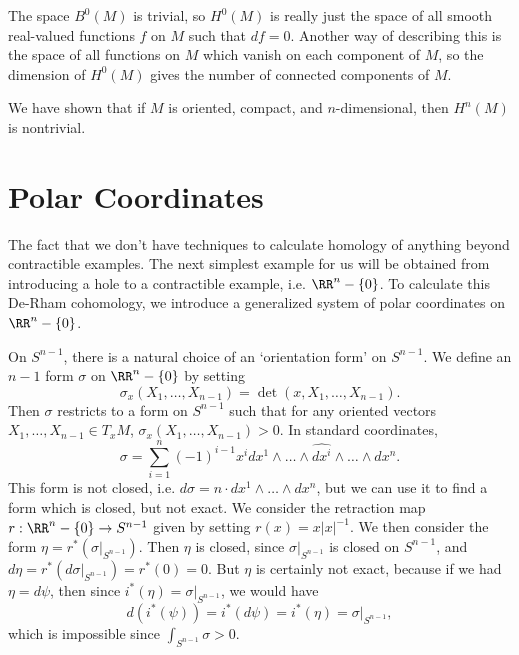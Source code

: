 \begin{example}
    The space $B^0(M)$ is trivial, so $H^0(M)$ is really just the space of all smooth real-valued functions $f$ on $M$ such that $df = 0$. Another way of describing this is the space of all functions on $M$ which vanish on each component of $M$, so the dimension of $H^0(M)$ gives the number of connected components of $M$.
\end{example}

\begin{example}
    We have shown that if $M$ is oriented, compact, and $n$-dimensional, then $H^n(M)$ is nontrivial.
\end{example}

\section{Polar Coordinates}

The fact that we don't have techniques to calculate homology of anything beyond contractible examples. The next simplest example for us will be obtained from introducing a hole to a contractible example, i.e. $\RR^n - \{ 0 \}$. To calculate this De-Rham cohomology, we introduce a generalized system of polar coordinates on $\RR^n - \{ 0 \}$.

On $S^{n-1}$, there is a natural choice of an `orientation form' on $S^{n-1}$. We define an $n-1$ form $\sigma$ on $\RR^n - \{ 0 \}$ by setting
%
\[ \sigma_x(X_1, \dots, X_{n-1}) = \det(x,X_1, \dots, X_{n-1}). \]
%
Then $\sigma$ restricts to a form on $S^{n-1}$ such that for any oriented vectors $X_1, \dots, X_{n-1} \in T_x M$, $\sigma_x(X_1, \dots, X_{n-1}) > 0$. In standard coordinates,
%
\[ \sigma = \sum_{i = 1}^n (-1)^{i-1} x^i dx^1 \wedge \dots \wedge \widehat{dx^i} \wedge \dots \wedge dx^n. \]
%
This form is not closed, i.e. $d\sigma = n \cdot dx^1 \wedge \dots \wedge dx^n$, but we can use it to find a form which is closed, but not exact. We consider the retraction map $r: \RR^n - \{ 0 \} \to S^{n-1}$ given by setting $r(x) = x |x|^{-1}$. We then consider the form $\eta = r^*( \sigma|_{S^{n-1}} )$. Then $\eta$ is closed, since $\sigma|_{S^{n-1}}$ is closed on $S^{n-1}$, and $d\eta = r^*( d\sigma|_{S^{n-1}}) = r^*(0) = 0$. But $\eta$ is certainly not exact, because if we had $\eta = d\psi$, then since $i^*(\eta) = \sigma|_{S^{n-1}}$, we would have
%
\[ d(i^*(\psi)) = i^*(d\psi) = i^*(\eta) = \sigma|_{S^{n-1}}, \]
%
which is impossible since $\int_{S^{n-1}} \sigma > 0$.

